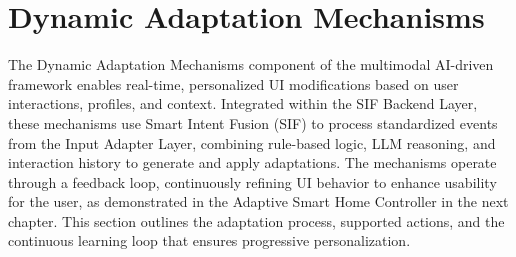 \documentclass[openany]{book}
\begin{document}
\section{Dynamic Adaptation Mechanisms}
The Dynamic Adaptation Mechanisms component of the multimodal AI-driven framework enables real-time, personalized UI modifications based on user interactions, profiles, and context. Integrated within the SIF Backend Layer, these mechanisms use Smart Intent Fusion (SIF) to process standardized events from the Input Adapter Layer, combining rule-based logic, LLM reasoning, and interaction history to generate and apply adaptations. The mechanisms operate through a feedback loop, continuously refining UI behavior to enhance usability for the user, as demonstrated in the Adaptive Smart Home Controller in the next chapter. This section outlines the adaptation process, supported actions, and the continuous learning loop that ensures progressive personalization.
\end{document}
